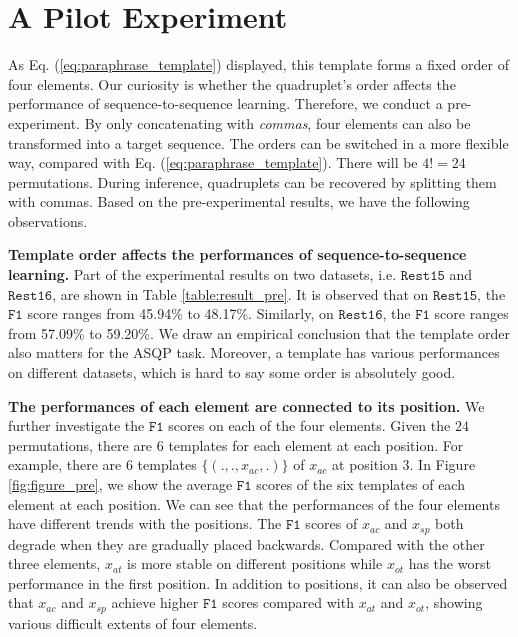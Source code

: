 \documentclass[11pt]{article}
\begin{document}
\section{A Pilot Experiment}
As Eq. (\ref{eq:paraphrase_template}) displayed, this template forms a fixed order of four elements. Our curiosity is whether the quadruplet's order affects the performance of sequence-to-sequence learning. Therefore, we conduct a pre-experiment. By only concatenating with \emph{commas}, four elements can also be transformed into a target sequence. The orders can be switched in a more flexible way, compared with Eq. (\ref{eq:paraphrase_template}). There will be $4!=24$ permutations. During inference, quadruplets can be recovered by splitting them with commas. Based on the pre-experimental results, we have the following observations.



\textbf{Template order affects the performances of sequence-to-sequence learning.} \; Part of the experimental results on two datasets, i.e. $\mathtt{Rest15}$ and $\mathtt{Rest16}$, are shown in Table \ref{table:result_pre}. It is observed that on $\mathtt{Rest15}$, the $\mathtt{F1}$ score ranges from 45.94\% to 48.17\%. Similarly, on $\mathtt{Rest16}$, the $\mathtt{F1}$ score ranges from 57.09\% to 59.20\%. We draw an empirical conclusion that the template order also matters for the ASQP task. Moreover, a template has various performances on different datasets, which is hard to say some order is absolutely good.

\textbf{The performances of each element are connected to its position.} We further investigate the $\mathtt{F1}$ scores on each of the four elements. Given the $24$ permutations, there are $6$ templates for each element at each position. For example, there are $6$ templates $\{(., ., x_{ac}, .)\}$ of $x_{ac}$ at position $3$. In Figure \ref{fig:figure_pre}, we show the average $\mathtt{F1}$ scores of the six templates of each element at each position. 
We can see that the performances of the four elements have different trends with the positions. The $\mathtt{F1}$ scores of $x_{ac}$ and $x_{sp}$ both degrade when they are gradually placed backwards. Compared with the other three elements, $x_{at}$ is more stable on different positions while $x_{ot}$ has the worst performance in the first position. In addition to positions, it can also be observed that $x_{ac}$ and $x_{sp}$ achieve higher $\mathtt{F1}$ scores compared with $x_{at}$ and $x_{ot}$, showing various difficult extents of four elements. 
\end{document}
